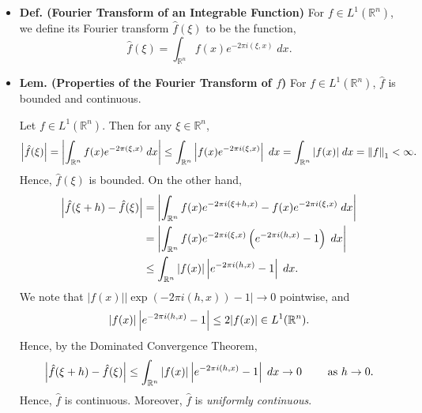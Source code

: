 \documentclass{article}
\begin{document}
\begin{itemize}
	\item \textbf{Def. (Fourier Transform of an Integrable Function)} For $f \in L^{1}(\mathbb{R}^{n})$, we define its Fourier transform $\hat{f}(\xi)$ to be the function, 
		\begin{equation}
			\hat{f}(\xi) = \int_{\mathbb{R}^{n}}f(x)e^{-2\pi i (\xi, x)}\;dx.
		\end{equation}
	
	\item \textbf{Lem. (Properties of the Fourier Transform of $f$)} For $f \in L^{1}(\mathbb{R}^{n})$, $\hat{f}$ is bounded and continuous. 
	
	{\color{blue}
		Let $f \in L^{1}(\mathbb{R}^{n})$. Then for any $\xi \in \mathbb{R}^{n}$, 
		\begin{equation}
			\left| \hat{f}(\xi) \right| = \left| \int_{\mathbb{R}^{n}}f(x)e^{-2\pi (\xi, x)}\;dx \right| \leq \int_{\mathbb{R}^{n}}\left| f(x)e^{-2\pi i (\xi, x)} \right|\;dx = \int_{\mathbb{R}^{n}}|f(x)|\;dx = \left\Vert f \right\Vert_{1} < \infty. 
		\end{equation}
	Hence, $\hat{f}(\xi)$ is bounded. On the other hand, 
		\begin{align}
			\begin{split}
				\left| \hat{f}(\xi + h) - \hat{f}(\xi) \right| &= \left| \int_{\mathbb{R}^{n}}f(x)e^{-2\pi i (\xi + h, x)} - f(x)e^{-2\pi i (\xi, x)}\;dx \right| \\
				&= \left| \int_{\mathbb{R}^{n}}f(x)e^{-2\pi i (\xi, x)}\left(e^{-2\pi i (h, x)} - 1\right)\;dx \right| \\
				&\leq \int_{\mathbb{R}^{n}}|f(x)|\left| e^{-2\pi i (h, x)} -1 \right|\;dx. 
			\end{split}
		\end{align}
	We note that $|f(x)||\exp(-2\pi i (h, x)) - 1| \to 0$ pointwise, and 
		\begin{equation}
			|f(x)|\left| e^{-2\pi i (h, x)} -1 \right| \leq 2|f(x)| \in L^{1}(\mathbb{R}^{n}). 
		\end{equation}
	Hence, by the Dominated Convergence Theorem, 
		\begin{equation}
			\left| \hat{f}(\xi + h) - \hat{f}(\xi) \right| \leq \int_{\mathbb{R}^{n}}|f(x)|\left| e^{-2\pi i (h, x)} -1 \right|\;dx \to 0 \qquad \text{ as $h \to 0$}. 
		\end{equation}
	Hence, $\hat{f}$ is continuous. Moreover, $\hat{f}$ is \textit{uniformly continuous}. 
	}
	

\end{itemize}
\end{document}

